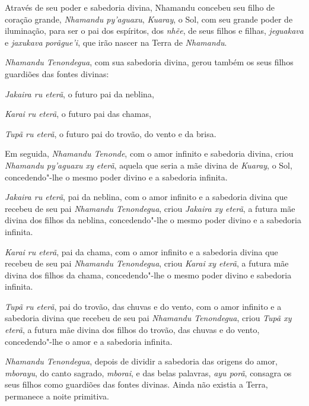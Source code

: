 
 

 

Através de seu poder e sabedoria divina, Nhamandu concebeu seu filho de
coração grande, \emph{Nhamandu py'aguaxu}, \emph{Kuaray}, o Sol, com seu
grande poder de iluminação, para ser o pai dos espíritos, dos
\emph{nhẽe}, de seus filhos e filhas, \emph{jeguakava} e \emph{jaxukava}
\emph{porãgue'i}, que irão nascer na Terra de \emph{Nhamandu}.

\emph{Nhamandu Tenondegua}, com sua sabedoria divina, gerou também os
seus filhos guardiões das fontes divinas:

\emph{Jakaira ru eterã}, o futuro pai da neblina,

\emph{Karai ru eterã}, o futuro pai das chamas,

\emph{Tupã ru eterã}, o futuro pai do trovão, do vento e da brisa.

Em seguida, \emph{Nhamandu Tenonde}, com o amor infinito e sabedoria
divina, criou \emph{Nhamandu py'aguaxu xy eterã}, aquela que seria a mãe
divina de \emph{Kuaray}, o Sol, concedendo"-lhe o mesmo poder divino e a
sabedoria infinita.

\emph{Jakaira ru eterã}, pai da neblina, com o amor infinito e a
sabedoria divina que recebeu de seu pai \emph{Nhamandu Tenondegua},
criou \emph{Jakaira xy eterã}, a futura mãe divina dos filhos da
neblina, concedendo"-lhe o mesmo poder divino e a sabedoria infinita.

\emph{Karai ru eterã}, pai da chama, com o amor infinito e a sabedoria
divina que recebeu de seu pai \emph{Nhamandu Tenondegua}, criou
\emph{Karai xy eterã}, a futura mãe divina dos filhos da chama,
concedendo"-lhe o mesmo poder divino e sabedoria infinita.

\emph{Tupã ru eterã}, pai do trovão, das chuvas e do vento, com o amor
infinito e a sabedoria divina que recebeu de seu pai \emph{Nhamandu
Tenondegua}, criou \emph{Tupã xy eterã}, a futura mãe divina dos filhos
do trovão, das chuvas e do vento, concedendo"-lhe o amor e a sabedoria
infinita.

\emph{Nhamandu Tenondegua}, depois de dividir a sabedoria das origens do
amor, \emph{mborayu}, do canto sagrado, \emph{mborai}, e das belas
palavras, \emph{ayu porã}, consagra os seus filhos como guardiões das
fontes divinas. Ainda não existia a Terra, permanece a noite primitiva.

